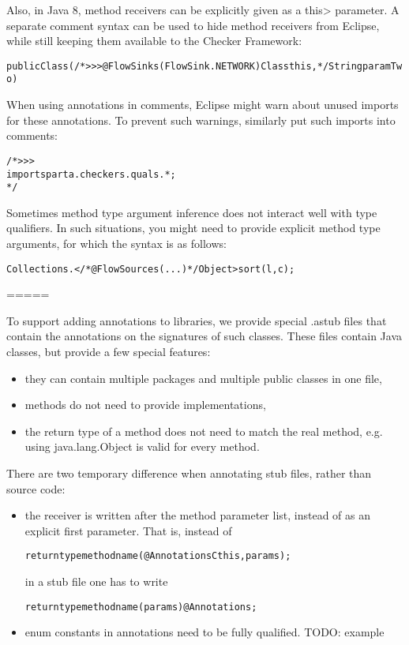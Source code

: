 Also, in Java 8, method receivers can be explicitly given as a \<this>
parameter.
A separate comment syntax can be used to hide method receivers from
Eclipse, while still keeping them available to the Checker Framework:

\begin{alltt}
	public Class(/*>>> @FlowSinks(FlowSink.NETWORK) Class this, */ String paramTwo) {}
\end{alltt}

When using annotations in comments, Eclipse might warn about unused
imports for these annotations. To prevent such warnings, similarly put
such imports into comments:

\begin{alltt}
/*>>>
import sparta.checkers.quals.*;
*/
\end{alltt}

Sometimes method type argument inference does not interact well with
type qualifiers. In such situations, you might need to provide
explicit method type arguments, for which the syntax is as follows:

\begin{alltt}
	Collections.</*@FlowSources({...})*/ Object>sort(l, c);
\end{alltt}

=====

To support adding annotations to libraries, we provide special .astub
files that contain the annotations on the signatures of such classes.
These files contain Java classes, but provide a few special features:
\begin{itemize}
\item they can contain multiple packages and multiple public classes in
 one file,
\item methods do not need to provide implementations,
\item the return type of a method does not need to match the real method,
 e.g. using java.lang.Object is valid for every method.
\end{itemize}

There are two temporary difference when annotating stub files, rather
than source code:
\begin{itemize}
\item the receiver is written after the method parameter list, instead of
as an explicit first parameter.
That is, instead of

\begin{alltt}
     returntype methodname(@Annotations C this, params);
\end{alltt}

in a stub file one has to write

\begin{alltt}
     returntype methodname(params) @Annotations;
\end{alltt}

\item enum constants in annotations need to be fully qualified. TODO: example
\end{itemize}



